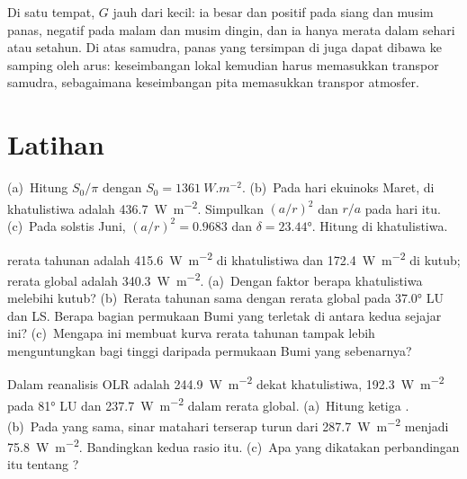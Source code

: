 \begin{remark}\label{rem:b1:radiation-heat-transport:local}
Di satu tempat, $G$ jauh dari kecil: ia besar dan positif pada siang dan musim panas, negatif pada malam dan musim dingin, dan ia hanya merata dalam sehari atau setahun. Di atas samudra, panas yang tersimpan di  juga dapat dibawa ke samping oleh arus: keseimbangan lokal kemudian harus memasukkan transpor samudra, sebagaimana keseimbangan pita  memasukkan transpor atmosfer.
\end{remark}

\section{Latihan}

\begin{exercise}[$\star$]\label{exo:b1:radiation-heat-transport:1}
(a)~Hitung $S_0/\pi$ dengan $S_0 = \qty{1361}{W.m^{-2}}$. (b)~Pada hari ekuinoks Maret,  di khatulistiwa adalah \qty{436.7}{W.m^{-2}}. Simpulkan $(a/r)^2$ dan $r/a$ pada hari itu. (c)~Pada solstis Juni, $(a/r)^2 = 0.9683$ dan
$\delta = \ang{23.44}$. Hitung  di khatulistiwa.
\end{exercise}

\begin{exercise}[$\star$]\label{exo:b1:radiation-heat-transport:2}
 rerata tahunan adalah \qty{415.6}{W.m^{-2}} di khatulistiwa dan \qty{172.4}{W.m^{-2}} di kutub; rerata global adalah \qty{340.3}{W.m^{-2}}. (a)~Dengan faktor berapa khatulistiwa melebihi kutub? (b)~Rerata tahunan sama dengan rerata global pada \ang{37.0} LU dan LS. Berapa bagian permukaan Bumi yang terletak di antara kedua sejajar ini? (c)~Mengapa ini membuat kurva rerata tahunan tampak lebih menguntungkan bagi  tinggi daripada permukaan Bumi yang sebenarnya?
\end{exercise}

\begin{exercise}[$\star$]\label{exo:b1:radiation-heat-transport:3}
Dalam reanalisis OLR adalah \qty{244.9}{W.m^{-2}} dekat khatulistiwa, \qty{192.3}{W.m^{-2}} pada \ang{81} LU dan \qty{237.7}{W.m^{-2}} dalam rerata global. (a)~Hitung ketiga . (b)~Pada  yang sama, sinar matahari terserap turun dari \qty{287.7}{W.m^{-2}} menjadi \qty{75.8}{W.m^{-2}}. Bandingkan kedua rasio itu. (c)~Apa yang dikatakan perbandingan itu tentang ?
\end{exercise}

